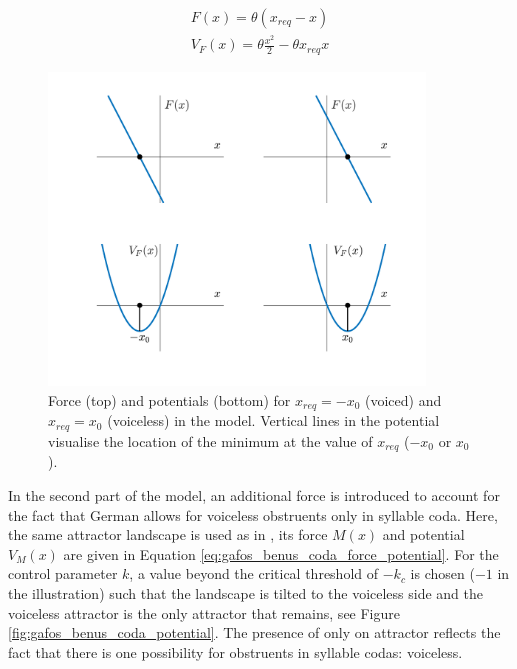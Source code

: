\begin{equation}
\begin{split}
F(x) = \theta (x_{req} - x) \\
V_F(x) = \theta \frac{x^2}{2} -\theta x_{req} x
\end{split}
\label{eq:gafos_benus_intentional_force_potential}
\end{equation}

\begin{figure}[h]
\begin{center}
\includegraphics[width=10cm]{figures/ch3/gafos_benus_intentional_dynamics.pdf}
\caption[Force and potential for voiced and voiceless obstruents in the \citet{GafosBenus2006} model.]{Force (top) and potentials (bottom) for $x_{req} = -x_0$ (voiced) and $x_{req} = x_0$ (voiceless) in the \citet{GafosBenus2006} model. Vertical lines in the potential visualise the location of the minimum at the value of $x_{req}$ ($-x_0$ or $x_0$).}
\label{fig:gafos_benus_intentional_force_potential}
\end{center}
\end{figure}

In the second part of the model, an additional force is introduced to account for the fact that German allows for voiceless obstruents only in syllable coda. Here, the same attractor landscape is used as in \citet{Tulleretal1994}, its force $M(x)$ and potential $V_M(x)$ are given in Equation \ref{eq:gafos_benus_coda_force_potential}. For the control parameter $k$, a value beyond the critical threshold of $-k_c$ is chosen ($-1$ in the illustration) such that the landscape is tilted to the voiceless side and the voiceless attractor is the only attractor that remains, see Figure \ref{fig:gafos_benus_coda_potential}. The presence of only on attractor reflects the fact that there is one possibility for obstruents in syllable codas: voiceless.

